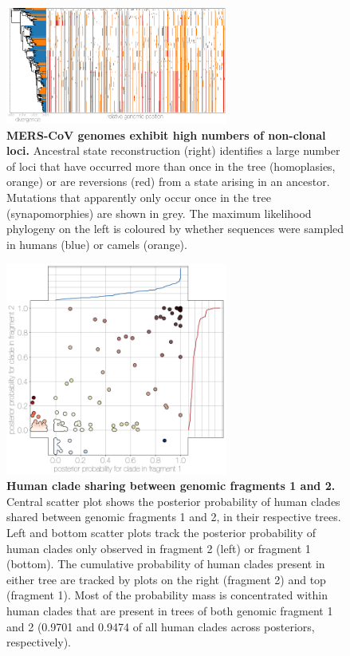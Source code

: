 \documentclass[11pt,oneside,letterpaper]{article}
\begin{document}
\begin{figure}[h]
\centering
	\includegraphics[width=0.65\textwidth]{figures/mers_incompatibilities.png}
	\caption{\textbf{MERS-CoV genomes exhibit high numbers of non-clonal loci.}
Ancestral state reconstruction (right) identifies a large number of loci that have occurred more than once in the tree (homoplasies, orange) or are reversions (red) from a state arising in an ancestor.
Mutations that apparently only occur once in the tree (synapomorphies) are shown in grey.
The maximum likelihood phylogeny on the left is coloured by whether sequences were sampled in humans (blue) or camels (orange).
	}
	\label{incompatibilities}
\end{figure}

\begin{figure}[h]
\centering
	\includegraphics[width=0.65\textwidth]{figures/mers_flower.png}
	\caption{\textbf{Human clade sharing between genomic fragments 1 and 2.}
Central scatter plot shows the posterior probability of human clades shared between genomic fragments 1 and 2, in their respective trees.
Left and bottom scatter plots track the posterior probability of human clades only observed in fragment 2 (left) or fragment 1 (bottom).
The cumulative probability of human clades present in either tree are tracked by plots on the right (fragment 2) and top (fragment 1).
Most of the probability mass is concentrated within human clades that are present in trees of both genomic fragment 1 and 2 (0.9701 and 0.9474 of all human clades across posteriors, respectively).
	}
	\label{flower}
\end{figure}
\end{document}

